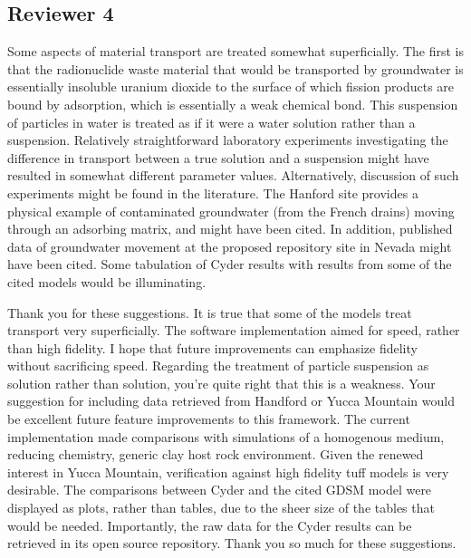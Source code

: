 \documentclass[answers,12pt]{exam}
\begin{document}
\begin{questions}
\section*{Reviewer 4}

\question  Some aspects of material transport are treated somewhat 
superficially. The
first is that the radionuclide waste material that would be transported by
groundwater is essentially insoluble uranium dioxide to the surface of which
fission products are bound by adsorption, which is essentially a weak chemical
bond.  This suspension of particles in water is treated as if it were a water
solution rather than a suspension.  Relatively straightforward laboratory
experiments investigating the difference in transport between a true solution
and a suspension might have resulted in somewhat different parameter values.
Alternatively, discussion of such experiments might be found in the literature.
The Hanford site provides a physical example of contaminated groundwater (from
the French drains) moving through an adsorbing matrix, and might have been
cited. In addition, published data of groundwater movement at the proposed
repository site in Nevada might have been cited.  Some tabulation of Cyder
results with results from some of the cited models would be illuminating.  
\begin{solution}
Thank you for these suggestions. It is true that some of the models treat 
        transport very superficially. The software implementation aimed for 
        speed, rather than high fidelity. I hope that future improvements can 
        emphasize fidelity without sacrificing speed. Regarding the treatment 
        of particle suspension as solution rather than solution, you're quite 
        right that this is a weakness. Your suggestion for including data 
        retrieved from Handford or Yucca Mountain would be excellent future 
        feature improvements to this framework. The current implementation made 
        comparisons with simulations of a homogenous medium, reducing 
        chemistry, generic clay host rock environment. Given the renewed 
        interest in Yucca Mountain, verification against high fidelity tuff 
        models is very desirable.  The comparisons between Cyder 
        and the cited GDSM model were displayed as plots, rather than tables, 
        due to the sheer size of the tables that would be needed. Importantly, 
        the raw data for the Cyder results can be retrieved in its open source 
        repository. Thank you so much for these suggestions. 
\end{solution}

\end{questions}
  
\end{document}
